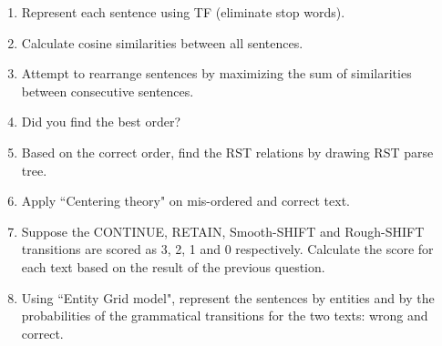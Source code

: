 \documentclass[11pt, a4paper]{article}
\begin{document}
\begin{enumerate}
	\item Represent each sentence using TF (eliminate stop words).
	\item Calculate cosine similarities between all sentences.
	\item Attempt to rearrange sentences by maximizing the sum of similarities between consecutive sentences.
	\item Did you find the best order?
	\item Based on the correct order, find the RST relations by drawing RST parse tree.
	\item Apply ``Centering theory" on mis-ordered and correct text.
	\item Suppose the CONTINUE, RETAIN, Smooth-SHIFT and Rough-SHIFT transitions are scored as 3, 2, 1 and 0 respectively.
	Calculate the score for each text based on the result of the previous question.
	\item Using ``Entity Grid model", represent the sentences by entities and by the probabilities of the grammatical transitions for the two texts: wrong and correct.
\end{enumerate}
\end{document}
